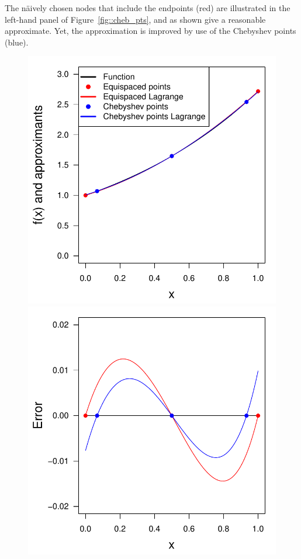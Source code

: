 \documentclass[11pt]{article}
\begin{document}
The n\"aively chosen nodes  that include the endpoints (red) are illustrated in the left-hand panel of Figure~\ref{fig::cheb_pts}, and as shown give a reasonable approximate.  Yet, the approximation is improved by use of the Chebyshev points (blue).  
%
\begin{figure}[h!]\centering
\begin{minipage}{0.48\textwidth}
\includegraphics[width=\textwidth]{cheb_pts_lagr.pdf}

\end{minipage}
\begin{minipage}{0.48\textwidth}

\includegraphics[width=\textwidth]{cheb_pts_lagr_err.pdf}


\end{minipage}
\end{figure}
\end{document}
